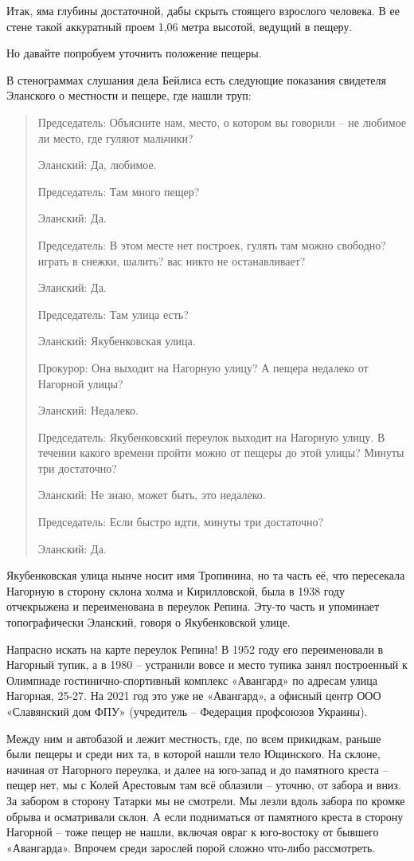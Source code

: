 Итак, яма глубины достаточной, дабы скрыть стоящего взрослого человека. В ее стене такой аккуратный проем 1,06 метра высотой, ведущий в пещеру.

Но давайте попробуем уточнить положение пещеры. 

В стенограммах слушания дела Бейлиса есть следующие показания свидетеля Эланского о местности и пещере, где нашли труп:

\begin{quotation}
Председатель: Объясните нам, место, о котором вы говорили – не любимое ли место, где гуляют мальчики?

Эланский: Да, любимое.

Председатель: Там много пещер?

Эланский: Да.

Председатель: В этом месте нет построек, гулять там можно свободно? играть в снежки, шалить? вас никто не останавливает?

Эланский: Да.

Председатель: Там улица есть?

Эланский: Якубенковская улица.

Прокурор: Она выходит на Нагорную улицу? А пещера недалеко от Нагорной улицы?

Эланский: Недалеко.

Председатель: Якубенковский переулок выходит на Нагорную улицу. В течении какого времени пройти можно от пещеры до этой улицы? Минуты три достаточно?

Эланский: Не знаю, может быть, это недалеко.

Председатель: Если быстро идти, минуты три достаточно?

Эланский: Да.
\end{quotation}

Якубенковская улица нынче носит имя Тропинина, но та часть её, что пересекала Нагорную в сторону склона холма и Кирилловской, была в 1938 году отчекрыжена и переименована в переулок Репина. Эту-то часть и упоминает топографически Эланский, говоря о Якубенковской улице. 

Напрасно искать на карте переулок Репина! В 1952 году его переименовали в Нагорный тупик, а в 1980 – устранили вовсе и место тупика занял построенный к Олимпиаде гостинично-спортивный комплекс «Авангард» по адресам улица Нагорная, 25-27. На 2021 год это уже не «Авангард», а офисный центр ООО «Славянский дом ФПУ» (учредитель – Федерация профсоюзов Украины).

Между ним и автобазой и лежит местность, где, по всем прикидкам, раньше были пещеры и среди них та, в которой нашли тело Ющинского. На склоне, начиная от Нагорного переулка, и далее на юго-запад и до памятного креста – пещер нет, мы с Колей Арестовым там всё облазили – уточню, от забора и вниз. За забором в сторону Татарки мы не смотрели. Мы лезли вдоль забора по кромке обрыва и осматривали склон. А если подниматься от памятного креста в сторону Нагорной – тоже пещер не нашли, включая овраг к юго-востоку от бывшего «Авангарда». Впрочем среди зарослей порой сложно что-либо рассмотреть.

